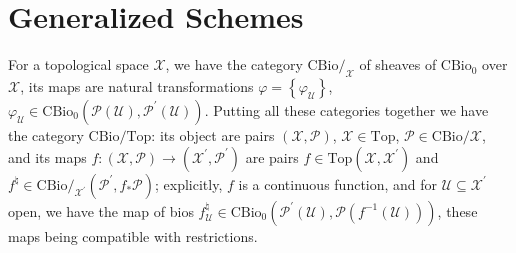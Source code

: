 \documentclass[leqno]{article}
\renewcommand{\top}{\text{Top}}
\newcommand{\xspace}{\mathcal{X}}
\newcommand{\biop}{\mathscr{P}}
\numberwithin{equation}{section}
\begin{document}
\section{Generalized Schemes} \label{sec:7}
For a topological space $\xspace$, we have the category $\text{CBio}/_{\xspace}$ of
sheaves of $\text{CBio}_0$ over $\xspace$, its maps are natural transformations
$\varphi=\left\{ \varphi_{\mathscr{U}} \right\}$, $\varphi_{\mathscr{U}}\in
\text{CBio}_0(\biop(\mathscr{U}),\biop^{\prime}(\mathscr{U}))$. Putting all these categories together we have
the category $\text{CBio}/\top$: its object are pairs $(\xspace,\biop)$,
$\xspace\in \top$, $\biop\in \text{CBio}/\xspace$, and its maps
$f:(\xspace,\biop)\to(\xspace^{\prime},\biop^{\prime})$ are pairs $f\in
\top(\xspace,\xspace^{\prime})$ and $f^{\natural}\in
\text{CBio}/_{\xspace^{\prime}} (\biop^\prime,f_{\ast}\biop) $; explicitly, $f$ is a
continuous function, and for $\mathscr{U}\subseteq \xspace^{\prime}$ open, we have the map of bios
$f_{\mathscr{U}}^{\natural}\in \text{CBio}_0 \left( \biop^{\prime}(\mathscr{U}),\biop\left(
f^{-1}(\mathscr{U}) \right) \right)$,
these maps being compatible with restrictions. 
\end{document}
